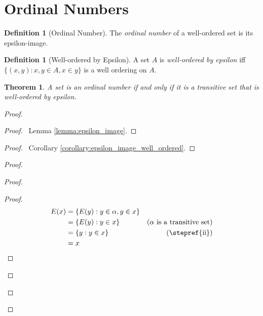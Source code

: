 \documentclass{article}
\let\qed\relax
\newtheorem{theorem}[axiom]{Theorem}
\theoremstyle{definition}
\newtheorem{definition}[axiom]{Definition}
\begin{document}
    \section{Ordinal Numbers}

    \begin{definition}[Ordinal Number]
        The \emph{ordinal number} of a well-ordered set is its epsilon-image.
    \end{definition}

    \begin{definition}[Well-ordered by Epsilon]
        A set $A$ is \emph{well-ordered by epsilon} iff $\{ (x,y) : x, y \in A, x \in y \}$ is a well
        ordering on $A$.
    \end{definition}

    \begin{theorem}
        \label{theorem:ordinals}
        A set is an ordinal number if and only if it is a transitive set that is well-ordered by epsilon.
    \end{theorem}

    \begin{proof}
        \pf
        \begin{proof}
            \pf\ Lemma \ref{lemma:epsilon_image}.
        \end{proof}
        \begin{proof}
            \pf\ Corollary \ref{corollary:epsilon_image_well_ordered}.
        \end{proof}
        \begin{proof}
            \begin{proof}
                \begin{proof}
                    \pf
                    \begin{align*}
                        E(x) & = \{ E(y) : y \in \alpha, y \in x \} \\
                        & = \{ E(y) : y \in x \} & (\text{$\alpha$ is a transitive set}) \\
                        & = \{ y : y \in x \} & (\text{\stepref{ii}}) \\
                        & = x
                    \end{align*}
                \end{proof}
            \end{proof}
        \end{proof}
        \qed
    \end{proof}
\end{document}
